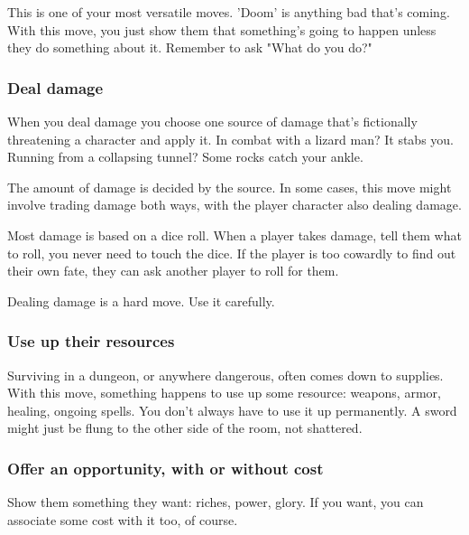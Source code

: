 This is one of your most versatile moves. 'Doom' is anything bad that's coming. With this move, you just show them that something's going to happen unless they do something about it. Remember to ask "What do you do?"

 
\subsubsection{Deal damage}    
 

When you deal damage you choose one source of damage that's fictionally threatening a character and apply it. In combat with a lizard man? It stabs you. Running from a collapsing tunnel? Some rocks catch your ankle.

 

The amount of damage is decided by the source. In some cases, this move might involve trading damage both ways, with the player character also dealing damage.

 

Most damage is based on a dice roll. When a player takes damage, tell them what to roll, you never need to touch the dice. If the player is too cowardly to find out their own fate, they can ask another player to roll for them.

 

Dealing damage is a hard move. Use it carefully.

 
\subsubsection{Use up their resources}   
 

Surviving in a dungeon, or anywhere dangerous, often comes down to supplies. With this move, something happens to use up some resource: weapons, armor, healing, ongoing spells. You don't always have to use it up permanently. A sword might just be flung to the other side of the room, not shattered.

 
\subsubsection{Offer an opportunity, with or without cost}     
 

Show them something they want: riches, power, glory. If you want, you can associate some cost with it too, of course.

